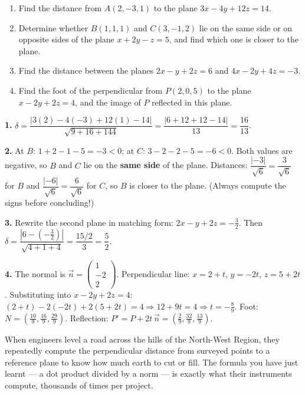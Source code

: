\documentclass[11pt]{article}
\begin{document}
\begin{exercice}[Practice]
\begin{enumerate}
\item Find the distance from $A(2,-3,1)$ to the plane $3x-4y+12z=14$.
\item Determine whether $B(1,1,1)$ and $C(3,-1,2)$ lie on the same side or on opposite sides of the plane $x+2y-z=5$, and find which one is closer to the plane.
\item Find the distance between the planes $2x-y+2z=6$ and $4x-2y+4z=-3$.
\item Find the foot of the perpendicular from $P(2,0,5)$ to the plane $x-2y+2z=4$, and the image of $P$ reflected in this plane.
\end{enumerate}
\end{exercice}

\begin{corrige}[Exercise 1]
\textbf{1.} $\delta=\dfrac{|3(2)-4(-3)+12(1)-14|}{\sqrt{9+16+144}}=\dfrac{|6+12+12-14|}{13}=\dfrac{16}{13}$.

\textbf{2.} At $B$: $1+2-1-5=-3<0$; at $C$: $3-2-2-5=-6<0$. Both values are negative, so $B$ and $C$ lie on the \textbf{same side} of the plane. Distances: $\dfrac{|-3|}{\sqrt{6}}=\dfrac{3}{\sqrt{6}}$ for $B$ and $\dfrac{|-6|}{\sqrt{6}}=\dfrac{6}{\sqrt{6}}$ for $C$, so $B$ is closer to the plane. (Always compute the signs before concluding!)

\textbf{3.} Rewrite the second plane in matching form: $2x-y+2z=-\tfrac{3}{2}$. Then $\delta=\dfrac{|6-(-\frac{3}{2})|}{\sqrt{4+1+4}}=\dfrac{15/2}{3}=\dfrac{5}{2}$.

\textbf{4.} The normal is $\vec{n}=\begin{pmatrix}1\\-2\\2\end{pmatrix}$. Perpendicular line: $x=2+t$, $y=-2t$, $z=5+2t$. Substituting into $x-2y+2z=4$: $(2+t)-2(-2t)+2(5+2t)=4\Rightarrow 12+9t=4\Rightarrow t=-\tfrac{8}{9}$. Foot: $N=\left(\tfrac{10}{9},\tfrac{16}{9},\tfrac{29}{9}\right)$. Reflection: $P'=P+2t\,\vec{n}=\left(\tfrac{2}{9},\tfrac{32}{9},\tfrac{13}{9}\right)$.
\end{corrige}

\begin{savaistu}
When engineers level a road across the hills of the North-West Region, they repeatedly compute the perpendicular distance from surveyed points to a reference plane to know how much earth to cut or fill. The formula you have just learnt — a dot product divided by a norm — is exactly what their instruments compute, thousands of times per project.
\end{savaistu}
\end{document}
